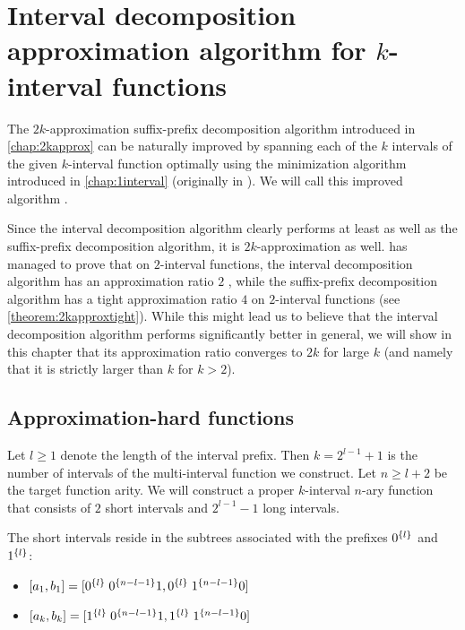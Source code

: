 \chapter{Interval decomposition approximation algorithm
for \texorpdfstring{$k$}{k}-interval functions}

The $2k$-approximation
suffix-prefix decomposition algorithm
introduced in \autoref{chap:2kapprox}
can be naturally improved
by spanning each of the $k$ intervals
of the given $k$-interval function
optimally using the minimization algorithm
introduced in \autoref{chap:1interval}
(originally in \citet{Schieber2005154}).
We will call this improved algorithm
.

Since the interval decomposition algorithm
clearly performs at least as well
as the suffix-prefix decomposition algorithm,
it is $2k$-approximation as well.
\citeauthor{Dubovsky2012} has managed
to prove that on $2$-interval functions,
the interval decomposition algorithm
has an approximation ratio $2$
\citep[p.~39]{Dubovsky2012}, %
while the suffix-prefix decomposition algorithm
has a tight approximation ratio $4$
on $2$-interval functions
(see \autoref{theorem:2kapproxtight}).
While this might lead us to believe
that the interval decomposition algorithm
performs significantly better in general,
we will show in this chapter that its approximation ratio
converges to $2k$ for large $k$
(and namely that it is strictly larger than $k$
for $k > 2$).

\section{Approximation-hard functions}

Let $l \geq 1$
denote the length of the interval prefix.
Then $k = 2^{l-1} + 1$
is the number of intervals
of the multi-interval function we construct.
Let $n \geq l+2$ be the target function arity.
We will construct
a proper $k$-interval $n$-ary function
that consists of $2$ short intervals and $2^{l-1} - 1$
long intervals.

The short intervals reside in the subtrees associated
with the prefixes $0^{\{l\}}$ and $1^{\{l\}}$:

\begin{itemize}
\item
$[a_1, b_1] =
[0^{\{l\}} \; 0^{\{n-l-1\}} 1, 0^{\{l\}} \; 1^{\{n-l-1\}} 0]$
\item
$[a_k, b_k] =
[1^{\{l\}} \; 0^{\{n-l-1\}} 1, 1^{\{l\}} \; 1^{\{n-l-1\}} 0]$
\end{itemize}

